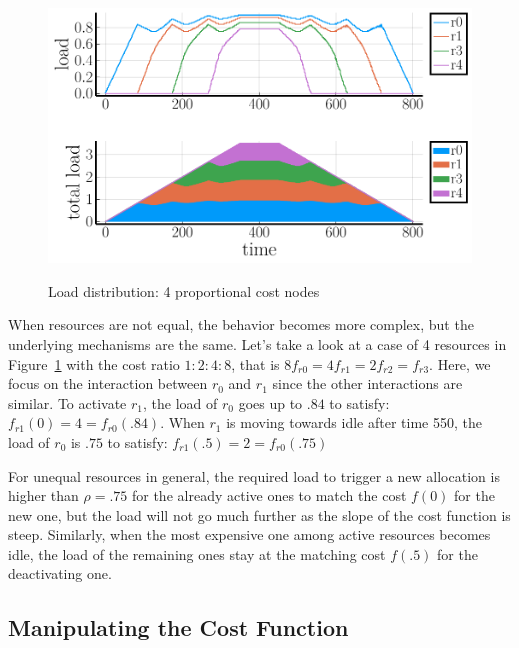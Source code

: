 \begin{figure}
  \begin{center}
    \includegraphics[width=1.0\columnwidth]{proportional_nodes.pdf}
    \vspace{-2.0ex}
    \caption{Load distribution: 4 proportional cost nodes}
    \label{fig:4node-ratio}
  \end{center}
\end{figure}

When resources are not equal, the behavior becomes more complex, but
the underlying mechanisms are the same.
Let's take a look at a case of 4 resources in Figure~\ref{fig:4node-ratio}
with the cost ratio $1:2:4:8$,
that is $8 f_{r0} = 4 f_{r1} = 2 f_{r2} = f_{r3}$.
Here, we focus on the interaction between $r_{0}$ and $r_{1}$ since
the other interactions are similar.
To activate $r_{1}$, the load of $r_{0}$ goes up to $.84$ to satisfy:
$f_{r1}(0) = 4 = f_{r0}(.84)$.
When $r_{1}$ is moving towards idle after time 550, the load
of $r_{0}$ is $.75$ to satisfy: $f_{r1}(.5) = 2 = f_{r0}(.75)$

For unequal resources in general, the required load to trigger a new
allocation is higher than $\rho = .75$ for the already
active ones to match the cost $f(0)$ for the new one, but the load
will not go much further as the slope of the cost function is steep.
Similarly, when the most expensive one among active resources becomes
idle, the load of the remaining ones stay at the matching cost 
$f(.5)$ for the deactivating one.


\subsection{Manipulating the Cost Function}
\label{sec:variation}

